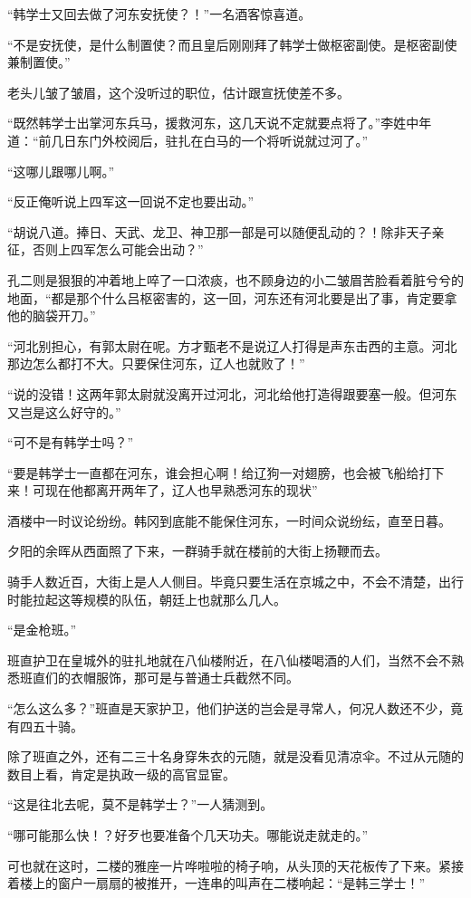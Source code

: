 “韩学士又回去做了河东安抚使？！”一名酒客惊喜道。

“不是安抚使，是什么制置使？而且皇后刚刚拜了韩学士做枢密副使。是枢密副使兼制置使。”

老头儿皱了皱眉，这个没听过的职位，估计跟宣抚使差不多。

“既然韩学士出掌河东兵马，援救河东，这几天说不定就要点将了。”李姓中年道：“前几日东门外校阅后，驻扎在白马的一个将听说就过河了。”

“这哪儿跟哪儿啊。”

“反正俺听说上四军这一回说不定也要出动。”

“胡说八道。捧日、天武、龙卫、神卫那一部是可以随便乱动的？！除非天子亲征，否则上四军怎么可能会出动？”

孔二则是狠狠的冲着地上啐了一口浓痰，也不顾身边的小二皱眉苦脸看着脏兮兮的地面，“都是那个什么吕枢密害的，这一回，河东还有河北要是出了事，肯定要拿他的脑袋开刀。”

“河北别担心，有郭太尉在呢。方才甄老不是说辽人打得是声东击西的主意。河北那边怎么都打不大。只要保住河东，辽人也就败了！”

“说的没错！这两年郭太尉就没离开过河北，河北给他打造得跟要塞一般。但河东又岂是这么好守的。”

“可不是有韩学士吗？”

“要是韩学士一直都在河东，谁会担心啊！给辽狗一对翅膀，也会被飞船给打下来！可现在他都离开两年了，辽人也早熟悉河东的现状”

酒楼中一时议论纷纷。韩冈到底能不能保住河东，一时间众说纷纭，直至日暮。

夕阳的余晖从西面照了下来，一群骑手就在楼前的大街上扬鞭而去。

骑手人数近百，大街上是人人侧目。毕竟只要生活在京城之中，不会不清楚，出行时能拉起这等规模的队伍，朝廷上也就那么几人。

“是金枪班。”

班直护卫在皇城外的驻扎地就在八仙楼附近，在八仙楼喝酒的人们，当然不会不熟悉班直们的衣帽服饰，那可是与普通士兵截然不同。

“怎么这么多？”班直是天家护卫，他们护送的岂会是寻常人，何况人数还不少，竟有四五十骑。

除了班直之外，还有二三十名身穿朱衣的元随，就是没看见清凉伞。不过从元随的数目上看，肯定是执政一级的高官显宦。

“这是往北去呢，莫不是韩学士？”一人猜测到。

“哪可能那么快！？好歹也要准备个几天功夫。哪能说走就走的。”

可也就在这时，二楼的雅座一片哗啦啦的椅子响，从头顶的天花板传了下来。紧接着楼上的窗户一扇扇的被推开，一连串的叫声在二楼响起：“是韩三学士！”


